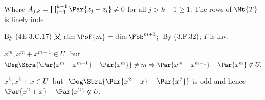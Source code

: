 Where $A_{j,k}=\prod_{i=1}^{k-1}\Par{z_j-z_i}\neq 0$ for all $j> k-1\geqslant 1.$ The rows of $\Mt{T}$ is linely inde.\vspace{4pt}\par\quad
By (4E 3.C.17) 又 $\dim\PoF{m}=\dim\Fbb^{m+1};\;$ \OR By (3.F.32); $T$ is inv.\PfEnd
\SepLine

$x^m,x^m+x^{m-1}\in U$ \,\,but\,\, $\Deg\Sbra{\Par{x^m+x^{m-1}}-\Par{x^m}}\neq m\Rightarrow \Par{x^m+x^{m-1}}-\Par{x^m}\not\in U.$\PfEnd
\SepLine

$x^2,x^2+x\in U$ \,\,but\,\, $\Deg\Sbra{\Par{x^2+x}-\Par{x^2}}$ is odd and hence $\Par{x^2+x}-\Par{x^2}\not\in U.$\PfEnd
\SepLine


